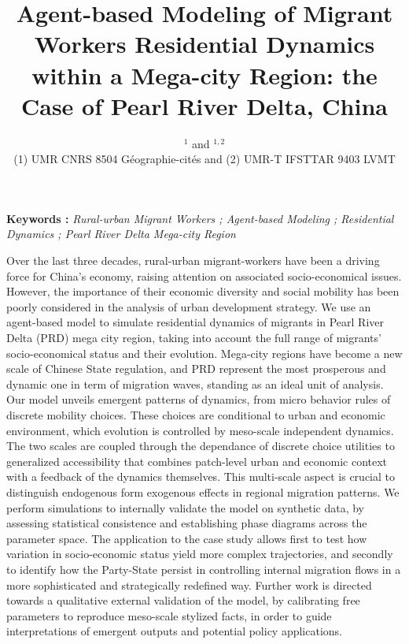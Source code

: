 


\title{Agent-based Modeling of Migrant Workers Residential Dynamics within a Mega-city Region: the Case of Pearl River Delta, China
}\bigskip
\bigskip
\author{$^{1}$ and $^{1,2}$\\
\small(1) UMR CNRS 8504 Géographie-cités and (2) UMR-T IFSTTAR 9403 LVMT
}
\date{}

\maketitle

\justify




\vspace{1cm}

\textbf{Keywords : }\textit{Rural-urban Migrant Workers ; Agent-based Modeling ; Residential Dynamics ; Pearl River Delta Mega-city Region}

\vspace{1.5cm}


Over the last three decades, rural-urban migrant-workers have been a driving force for China's economy, raising attention on associated socio-economical issues. However, the importance of their economic diversity and social mobility has been poorly considered in the analysis of urban development strategy.
We use an agent-based model to simulate residential dynamics of migrants in Pearl River Delta (PRD) mega city region, taking into account the full range of migrants’ socio-economical status and their evolution. Mega-city regions have become a new scale of Chinese State regulation, and PRD represent the most prosperous and dynamic one in term of migration waves, standing as an ideal unit of analysis.
Our model unveils emergent patterns of dynamics, from micro behavior rules of discrete mobility choices. These choices are conditional to urban and economic environment, which evolution is controlled by meso-scale independent dynamics.
The two scales are coupled through the dependance of discrete choice utilities to generalized accessibility that combines patch-level urban and economic context with a feedback of the dynamics themselves. This multi-scale aspect is crucial to distinguish endogenous form exogenous effects in regional migration patterns.
We perform simulations to internally validate the model on synthetic data, by assessing statistical consistence and establishing phase diagrams across the parameter space.
The application to the case study allows first to test how variation in socio-economic status yield more complex trajectories, and secondly to identify how the Party-State persist in controlling internal migration flows in a more sophisticated and strategically redefined way.
Further work is directed towards a qualitative external validation of the model, by calibrating free parameters to reproduce meso-scale stylized facts, in order to guide interpretations of emergent outputs and potential policy applications.

